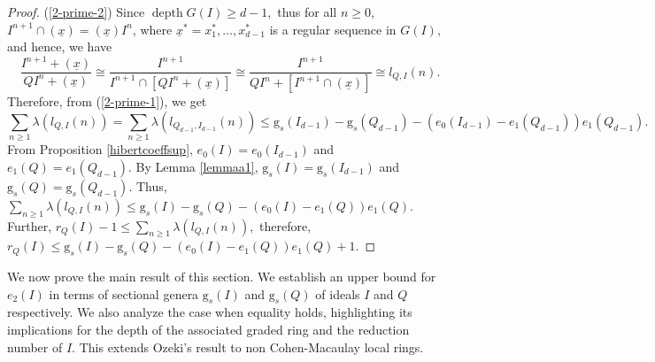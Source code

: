 \documentclass[reqno,a4paper,dvipsnames]{amsart}
\newcommand{\depth}{\operatorname{depth}}
\theoremstyle{definition}
\begin{document}
\begin{proof}
(\ref{2-prime-2}) Since $\depth G(I) \geq d-1,$ thus for all $n \geq 0$, $I^{n+1}\cap (\underline{x})=(\underline{x})I^{n}$, where $\underline{x}^{*}=x_{1}^{*},\ldots,x_{d-1}^{*}$ is a regular sequence in $G(I),$ and hence,   we have  
\begin{equation} \label{iso-length1}
        \frac{I^{n+1}+(\underline{x})}{QI^{n}+(\underline{x})} 
 \cong \frac{I^{n+1}}{I^{n+1} \cap [QI^{n}+(\underline{x})]} 
 \cong \frac{I^{n+1}}{QI^{n}+[I^{n+1}\cap(\underline{x})]}
 \cong l_{Q,I}(n).
\end{equation}
Therefore, from (\ref{2-prime-1}), we get $$\displaystyle \sum_{n \geq 1}\lambda( l_{Q,I}(n))=\displaystyle \sum_{n \geq 1}\lambda( l_{Q_{d-1},I_{d-1}}(n))\leq  \mathrm{g}_{s}(I_{d-1})-\mathrm{g}_{s}(Q_{d-1})-(e_{0}(I_{d-1})-e_{1}(Q_{d-1}))e_{1}(Q_{d-1}).$$
From Proposition \ref{hibertcoeffsup},  $e_{0}(I) = e_{0}(I_{d-1})$ and $e_{1}(Q) = e_{1}(Q_{d-1})$. By Lemma \ref{lemmaa1}, $\mathrm{g}_s(I) = \mathrm{g}_s(I_{d-1})$ and $\mathrm{g}_s(Q) = \mathrm{g}_s(Q_{d-1})$. Thus, $\displaystyle \sum_{n \geq 1}\lambda( l_{Q,I}(n))\leq \mathrm{g}_{s}(I)-\mathrm{g}_{s}(Q)-(e_{0}(I)-e_{1}(Q))e_{1}(Q).$ Further, $r_{Q}(I)-1\leq\displaystyle \sum_{n \geq 1}\lambda( l_{Q,I}(n)),$ therefore, $r_{Q}(I)\leq \mathrm{g}_{s}(I)-\mathrm{g}_{s}(Q)-(e_{0}(I)-e_{1}(Q))e_{1}(Q)+1.$
\end{proof}

We now prove the main result of this section. We establish an upper bound for $e_{2}(I)$ in terms of sectional genera  $\mathrm{g}_{s}(I)$ and $\mathrm{g}_{s}(Q)$ of ideals $I$ and $Q$ respectively. We also analyze the case when equality holds, highlighting its implications for the depth of the associated graded ring and the reduction number of $I.$  This extends Ozeki's result \cite[Theorem 3.4]{ozeki} to  non Cohen-Macaulay local rings.
\end{document}
